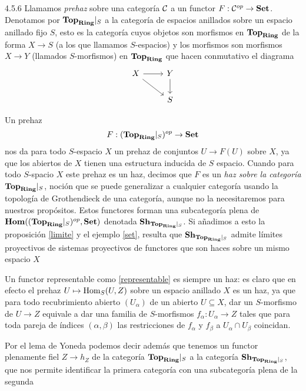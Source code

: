\documentclass[twoside]{article}
\begin{document}
\begin{remarque}{4.5.6}\label{prehaz}
Llamamos \emph{prehaz} sobre una categoría ${\mathcal C}$ a un functor $F:{\mathcal C}^{op}\to\mathrm{\mathbf{Set}}$. Denotamos por $\mathrm{\mathbf{Top}}_{\mathrm{\mathbf{Ring}}}|_S$ a la categoría de espacios anillados sobre un espacio anillado fijo $S$, esto es la categoría cuyos objetos son morfismos en $\mathrm{\mathbf{Top}}_{\mathrm{\mathbf{Ring}}}$ de la forma $X\to S$ (a los que llamamos $S$-espacios) y los morfismos son morfismos $X\to Y$ (llamados $S$-morfismos) en $\mathrm{\mathbf{Top}}_{\mathrm{\mathbf{Ring}}}$ que hacen conmutativo el diagrama
\[
\begin{tikzcd}
X\arrow[r]\arrow[dr] & Y\arrow[d]\\
 & S
\end{tikzcd}
\]

Un prehaz 
\begin{equation}\label{representable}
F:(\mathrm{\mathbf{Top}}_{\mathrm{\mathbf{Ring}}}|_S)^{op}\to\mathrm{\mathbf{Set}}
\end{equation}
 nos da para todo $S$-espacio $X$ un prehaz de conjuntos $U\to F(U)$ sobre $X$, ya que los abiertos de $X$ tienen una estructura inducida de $S$ espacio. Cuando para todo $S$-spacio $X$ este prehaz es un haz, decimos que $F$ es un \emph{haz sobre la categoría} $\mathrm{\mathbf{Top}}_{\mathrm{\mathbf{Ring}}}|_S$, noción que se puede generalizar a cualquier categoría usando la topología de Grothendieck de una categoría, aunque no la necesitaremos para nuestros propósitos. Estos functores forman una subcategoría plena de $\mathrm{\mathbf{Hom}}((\mathrm{\mathbf{Top}}_{\mathrm{\mathbf{Ring}}}|_S)^{op},\mathrm{\mathbf{Set}})$ denotada $\mathrm{\mathbf{Sh}}_{\mathrm{\mathbf{Top}}_{\mathrm{\mathbf{Ring}}}|_S}$. Si añadimos a esto la proposición \ref{limite} y el ejemplo \ref{set}, resulta que $\mathrm{\mathbf{Sh}}_{\mathrm{\mathbf{Top}}_{\mathrm{\mathbf{Ring}}}|_S}$ admite límites proyectivos de sistemas proyectivos de functores que son haces sobre un mismo espacio $X$  %


Un functor representable como \ref{representable} es siempre un haz: es claro que en efecto el prehaz $U\mapsto\operatorname{Hom}_S(U,Z)$ sobre un espacio anillado $X$ es un haz, ya que para todo recubrimiento abierto $(U_\alpha)$ de un abierto $U\subseteq X$, dar un $S$-morfismo de $U\to Z$ equivale a dar una familia de $S$-morfismos $f_\alpha:U_\alpha\to Z$ tales que para toda pareja de índices $(\alpha,\beta)$ las restricciones de $f_\alpha$ y $f_\beta$ a $U_\alpha\cap U_\beta$ coincidan.

Por el lema de Yoneda podemos decir además que tenemos un functor plenamente fiel $Z\to h_Z$ de la categoría $\mathrm{\mathbf{Top}}_{\mathrm{\mathbf{Ring}}}|_S$ a la categoría $\mathrm{\mathbf{Sh}}_{\mathrm{\mathbf{Top}}_{\mathrm{\mathbf{Ring}}}|_S}$, que nos permite identificar la primera categoría con una subcategoría plena de la segunda %


\end{remarque}
\end{document}
